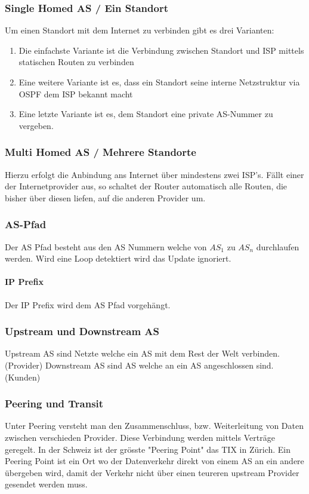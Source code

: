 \subsubsection{Single Homed AS / Ein Standort}
Um einen Standort mit dem Internet zu verbinden gibt es drei Varianten: 
\begin{enumerate}
	\item Die einfachste Variante ist die Verbindung zwischen Standort und ISP mittels statischen Routen zu verbinden
	\item Eine weitere Variante ist es, dass ein Standort seine interne Netzstruktur via OSPF dem ISP bekannt macht
	\item Eine letzte Variante ist es, dem Standort eine private AS-Nummer zu vergeben. 
\end{enumerate}

\subsubsection{Multi Homed AS / Mehrere Standorte}
Hierzu erfolgt die Anbindung ans Internet über mindestens zwei ISP's. Fällt einer der Internetprovider aus, so schaltet der Router automatisch alle Routen, die bisher über diesen liefen, auf die anderen Provider um.

\subsubsection{AS-Pfad}
Der AS Pfad besteht aus den AS Nummern welche von $AS_1$ zu $AS_n$ durchlaufen werden. Wird eine Loop detektiert wird das Update ignoriert.

\paragraph{IP Prefix} Der IP Prefix wird dem AS Pfad vorgehängt.

\subsubsection{Upstream und Downstream AS}
Upstream AS sind Netzte welche ein AS mit dem Rest der Welt verbinden. (Provider) Downstream AS sind AS welche an ein AS angeschlossen sind. (Kunden)

\subsubsection{Peering und Transit}
Unter Peering versteht man den Zusammenschluss, bzw. Weiterleitung von Daten zwischen verschieden Provider. Diese Verbindung werden mittels Verträge geregelt. In der Schweiz ist der grösste "Peering Point" das TIX in Zürich. Ein Peering Point ist ein Ort wo der Datenverkehr direkt von einem AS an ein andere übergeben wird, damit der Verkehr nicht über einen teureren upstream Provider gesendet werden muss.

